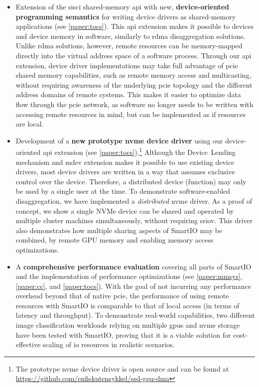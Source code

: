 \begin{itemize}
    \item Extension of the \gls{sisci} shared-memory \gls{api} with new, \textbf{device-oriented programming semantics} for writing device drivers as shared-memory applications (see \cref{paper:tocs}).
	This \gls{api} extension makes it possible to  devices and device memory in software, similarly to \gls{rdma} \gls{disaggregation} solutions.
	Unlike \gls{rdma} solutions, however, remote resources can be memory-mapped directly into the virtual address space of a software process.
	Through our \gls{api} extension, device driver implementations may take full advantage of \gls{pcie} shared memory capabilities, such as remote memory access and multicasting, without requiring awareness of the underlying \gls{pcie} topology and the different address domains of remote systems.
	This makes it easier to optimize data flow through the \gls{pcie} network, as software no longer needs to be written with accessing remote resources in mind, but can be implemented as if resources are local.

    \item Development of a \textbf{new prototype \gls{nvme} device driver} using our device-oriented \gls{api} extension (see \cref{paper:tocs}).\footnote{The prototype \gls{nvme} device driver is open source and can be found at \mbox{\url{https://github.com/enfiskutensykkel/ssd-gpu-dma}}}
    Although the Device~Lending mechanism and \gls{mdev} extension makes it possible to use existing device drivers, most device drivers are written in a way that assumes exclusive control over the device. Therefore, a distributed device (function) may only be used by a single user at the time.
    To demonstrate software-enabled \gls{disaggregation}, we have implemented a \emph{distributed} \gls{nvme} driver. As a proof of concept, we show a single NVMe device can be shared and operated by multiple cluster machines simultaneously, without requiring \gls{sriov}.
	This driver also demonstrates how multiple sharing aspects of SmartIO may be combined, 
	by  remote GPU memory and enabling memory access optimizations.

    \item A \textbf{comprehensive performance evaluation} covering all parts of SmartIO and the implementation of performance optimizations (see \cref{paper:mmsys}, \cref{paper:cc}, and \cref{paper:tocs}). With the goal of not incurring any performance overhead beyond that of native \gls{pcie}, the performance of using remote resources with SmartIO is comparable to that of local access (in terms of latency and throughput).
    To demonstrate real-world capabilities, two different image classification workloads relying on multiple \glspl{gpu} and \gls{nvme} storage have been tested with SmartIO, proving that it is a viable solution for cost-effective scaling of \gls{io} resources in realistic scenarios.
	
\end{itemize}
